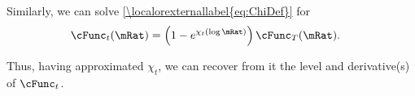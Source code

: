 \documentclass[\econtexRoot/BufferStockTheory]{subfiles}
\begin{document}
\begin{comment} %
\begin{equation}\begin{gathered}\begin{aligned}
 \lim_{\mu \downarrow -\infty} \chi^{\prime}(\mu)  & = \left(\frac{-\left(\frac{\cFunc^{\prime}_{t}\cFunc_{T}^{\prime}\mRat-\cFunc_{t}^{\prime}\mRat\cFunc_{T}^{\prime}}{(\cFunc_{T}^{\prime}\mRat)^{2}}\mRat\right)}{(\cFunc_{T}^{\prime}\mRat-\cFunc_{t}^{\prime}\mRat)/\cFunc_{T}^{\prime}\mRat}\right)
\\  & = \left(\frac{-\left(\frac{\cFunc^{\prime}_{t}\cFunc_{T}^{\prime}-\cFunc_{t}^{\prime}\cFunc_{T}^{\prime}}{(\cFunc_{T}^{\prime})^{2}}\right)}{(\cFunc_{T}^{\prime}-\cFunc_{t}^{\prime})/\cFunc_{T}^{\prime}}\right)
\\  & = \left(\frac{-\left(\cFunc^{\prime}_{t}\cFunc_{T}^{\prime}-\cFunc_{t}^{\prime}\cFunc_{T}^{\prime}\right)}{(\cFunc_{T}^{\prime}-\cFunc_{t}^{\prime})\cFunc_{T}^{\prime}}\right)
\end{aligned}\end{gathered}\end{equation}
\end{comment}

Similarly, we can solve \eqref{\localorexternallabel{eq:ChiDef}} for
\begin{equation}\begin{gathered}\begin{aligned}
    \cFunc_{t}(\mRat)  & = \left(1-e^{\chi_{t}(\log \mRat)}\right)\cFunc_{T}(\mRat) \label{eq:cFuncFromChi}.
\end{aligned}\end{gathered}\end{equation}

Thus, having approximated $\chi_{t}$, we can recover from it
the level and derivative(s) of $\cFunc_{t}$.

\end{document}
